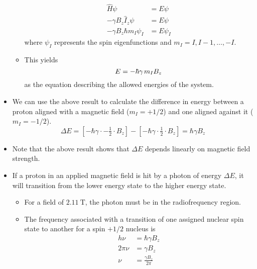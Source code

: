 \documentclass[../notes.tex]{subfiles}
\begin{document}
\begin{itemize}
\begin{itemize}
        \begin{align*}
            \hat{H}\psi &= E\psi\\
            -\gamma B_z\hat{I}_z\psi &= E\psi\\
            -\gamma B_z\hbar m_I\psi_I &= E\psi_I
        \end{align*}
        where $\psi_I$ represents the spin eigenfunctions and $m_I=I,I-1,\dots,-I$.
        \item This yields
        \begin{equation*}
            E = -\hbar\gamma\hspace{0.13em}m_IB_z
        \end{equation*}
        as the equation describing the allowed energies of the system.
    \end{itemize}
    \item We can use the above result to calculate the difference in energy between a proton aligned with a magnetic field ($m_I=+1/2$) and one aligned against it ($m_I=-1/2$).
    \begin{equation*}
        \Delta E = [-\hbar\gamma\cdot -\tfrac{1}{2}\cdot B_z]-[-\hbar\gamma\cdot\tfrac{1}{2}\cdot B_z]
        = \hbar\gamma B_z
    \end{equation*}
    \item Note that the above result shows that $\Delta E$ depends linearly on magnetic field strength.
    \item If a proton in an applied magnetic field is hit by a photon of energy $\Delta E$, it will transition from the lower energy state to the higher energy state.
    \begin{itemize}
        \item For a field of $\SI{2.11}{\tesla}$, the photon must be in the radiofrequency region.
        \item The frequency associated with a transition of one assigned nuclear spin state to another for a spin $+1/2$ nucleus is
        \begin{align*}
            h\nu &= \hbar\gamma B_z\\
            2\pi\nu &= \gamma B_z\\
            \nu &= \frac{\gamma B_z}{2\pi}
        \end{align*}
    \end{itemize}
\end{itemize}
\end{document}
